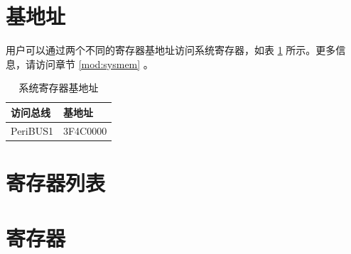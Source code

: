 \documentclass[main\_\_CN.tex]{subfiles}
\begin{document}
\section{基地址}\label{subsection:system-reg-base-address}

用户可以通过两个不同的寄存器基地址访问系统寄存器，如表 \ref{table:system-reg-base-address} 所示。更多信息，请访问章节 \ref{mod:sysmem} \textit{}。


\begin{table}[H]
    \centering
    \caption{系统寄存器基地址}
    \label{table:system-reg-base-address}
    \begin{tabular}{ |l|l| }
    \hline
    \rowcolor{lightgray}
    访问总线 & 基地址\\
    \hline
    PeriBUS1      & \hexprefix{}3F4C0000\\
    \hline
    \end{tabular}
\end{table}

\hypertarget{sysreg-reg-summ}{}
\section{寄存器列表}



\section{寄存器}

\end{document}
